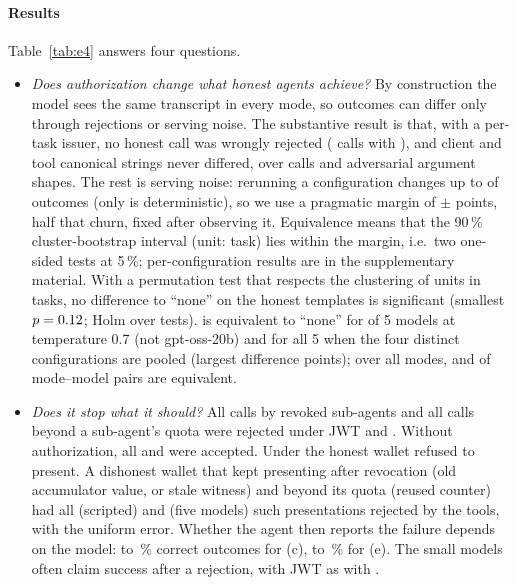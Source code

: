 \paragraph*{Results} Table~\ref{tab:e4} answers four questions.
\begin{itemize}
\item \emph{Does authorization change what honest agents achieve?} By construction the model sees the same transcript in every mode, so outcomes can differ only through rejections or serving noise. The substantive result is that, with a per-task issuer, no honest call was wrongly rejected (\EFourHonestCalls{} calls with \sys{}), and client and tool canonical strings never differed, over \EFourCalls{} calls and \EFourProbeCases{} adversarial argument shapes. The rest is serving noise: rerunning a configuration changes up to \EFourRepMax{} of \EFourRepPairs{} outcomes (only \EFourRepDetModel{} is deterministic), so we use a pragmatic margin of $\pm$\EFourMarginPP{} points, half that churn, fixed after observing it. Equivalence means that the 90\,\% cluster-bootstrap interval (unit: task) lies within the margin, i.e.\ two one-sided tests at 5\,\%; per-configuration results are in the supplementary material. With a permutation test that respects the clustering of units in tasks, no difference to ``none'' on the honest templates is significant (smallest $p=0.12{}$; Holm over \EFourNTests{} tests). \sys{} is equivalent to ``none'' for \EFourMMEqTsev{} of 5 models at temperature 0.7 (not gpt-oss-20b) and for all 5 when the four distinct configurations are pooled (largest difference \EFourMMMaxDiff{} points); over all modes, \EFourEqTsev{} and \EFourEqAll{} of \EFourEqPairs{} mode--model pairs are equivalent.
\item \emph{Does it stop what it should?} All \EFourRevAtt{} calls by revoked sub-agents and all \EFourQuotaAtt{} calls beyond a sub-agent's quota were rejected under JWT and \sys{}. Without authorization, all \EFourRevNone{} and \EFourQuotaNone{} were accepted. Under \sys{} the honest wallet refused to present. A dishonest wallet that kept presenting after revocation (old accumulator value, or stale witness) and beyond its quota (reused counter) had all \EFourDwSent{} (scripted) and \EFourDwLlmSent{} (five models) such presentations rejected by the tools, with the uniform error. Whether the agent then reports the failure depends on the model: \EFourSafeMin{} to \EFourSafeMax{}\,\% correct outcomes for (c), \EFourQuotaMin{} to \EFourQuotaMax{}\,\% for (e). The small models often claim success after a rejection, with JWT as with \sys{}.

\end{itemize}
